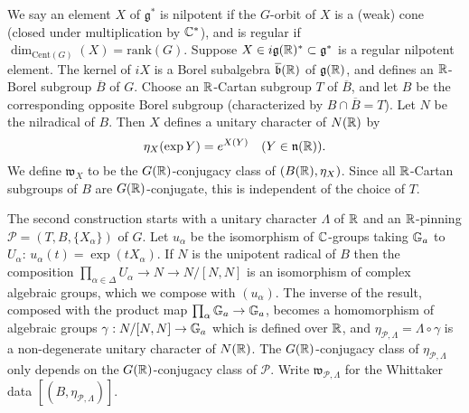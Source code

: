 \documentclass{article}
\theoremstyle{definition}
\numberwithin{equation}{section}
\renewcommand{\-}{\hyp{}}
\newcommand{\n}{\mathfrak n}
\newcommand{\g}{\mathfrak g}
\renewcommand{\P}{\mathcal P}
\newcommand{\w}{\mathfrak w}
\newcommand{\Cent}{\mathrm{Cent}}
\begin{document}
We say an element $X$ of $\g^*$ is nilpotent if the $G$-orbit of $X$
is a (weak) cone (closed under multiplication by $\mathbb{C}^*$), and is
regular if $\dim_{\Cent(G)}(X)=\mathrm{rank}(G)$.  Suppose
$X\in i\g(\R)^*\subset \g^*$ is a regular nilpotent element.  The
kernel of $iX$ is a Borel subalgebra $\overline{\mathfrak b}(\mathbb{R})$ of
$\g(\R)$, and defines an $\mathbb{R}$-Borel subgroup $\overline B$ of $G$.
Choose an $\mathbb{R}$-Cartan subgroup $T$ of
$\overline B$, and let $B$ be the corresponding opposite Borel
subgroup (characterized by $B\cap \overline B=T$). 
Let $N$ be the nilradical of $B$.  Then $X$ defines a unitary
character of $N(\mathbb{R})$ by
$$
\eta_X(\exp Y)=e^{X(Y)}\quad (Y\in\n(\R)).
$$
We define
$\w_X$ to be the $G(\mathbb{R})$-conjugacy class of $(B(\mathbb{R}),\eta_X)$. 
Since all $\mathbb{R}$-Cartan subgroups of $B$ are $G(\mathbb{R})$-conjugate,
\cite[Theorem 19.2]{Bor91} this is independent of the choice of $T$.




The second construction starts with a unitary character $\Lambda$ of $\mathbb{R}$ and an $\mathbb{R}$-pinning $\P=(T,B,\{X_\alpha\})$ of $G$.  
Let $u_\alpha$ be the isomorphism of $\mathbb{C}$-groups taking $\mathbb{G}_a$ to $U_\alpha$: $u_\alpha(t)=\exp(t X_\alpha)$. 
If $N$ is the unipotent radical of $B$ then the
composition $\prod_{\alpha \in \Delta} U_\alpha \to N \to N/[N,N]$ is
an isomorphism of complex algebraic groups, which we compose with
$(u_\alpha)$. The inverse of the result, composed with the product map
$\prod_\alpha \mathbb{G}_a \to \mathbb{G}_a$, becomes a homomorphism of
algebraic groups $\gamma : N/[N,N] \to \mathbb{G}_a$ which is  defined over $\mathbb{R}$, and 
 $\eta_{\P,\Lambda}=\Lambda\circ \gamma$ is a non-degenerate unitary character of $N(\mathbb{R})$.
The $G(\mathbb{R})$-conjugacy class of $\eta_{\P,\Lambda}$ only depends on the $G(\mathbb{R})$-conjugacy class of  $\P$.
  Write $\w_{\P,\Lambda}$ for the Whittaker data
$[(B,\eta_{\P,\Lambda})]$.
\end{document}
